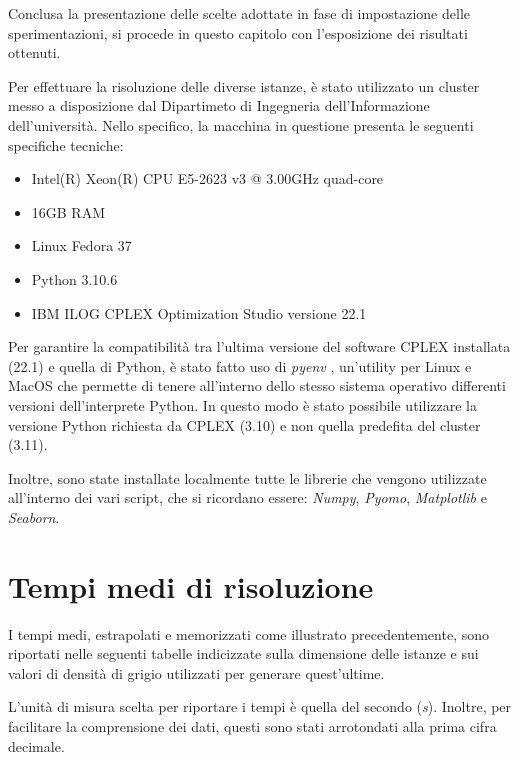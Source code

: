 Conclusa la presentazione delle scelte adottate in fase di impostazione delle sperimentazioni, 
si procede in questo capitolo con l'esposizione dei risultati ottenuti. 

Per effettuare la risoluzione delle diverse istanze, è stato utilizzato un cluster messo a disposizione dal Dipartimeto di Ingegneria dell'Informazione 
dell'università. Nello specifico, la macchina in questione presenta le seguenti specifiche tecniche:
\begin{itemize}
\item Intel(R) Xeon(R) CPU E5-2623 v3 @ 3.00GHz quad-core
\item 16GB RAM
\item Linux Fedora 37
\item Python 3.10.6
\item IBM ILOG CPLEX Optimization Studio versione 22.1
\end{itemize}
Per garantire la compatibilità tra l'ultima versione del software CPLEX installata (22.1) e quella di Python, è stato fatto uso di \textit{pyenv} \cite{pyenv}, 
un'utility per Linux e MacOS che permette di tenere all'interno dello stesso sistema operativo differenti versioni dell'interprete Python. In questo modo 
è stato possibile utilizzare la versione Python richiesta da CPLEX (3.10) e non quella predefita del cluster (3.11).

Inoltre, sono state installate localmente tutte le librerie che vengono utilizzate all'interno dei vari script, che si ricordano 
essere: \textit{Numpy}, \textit{Pyomo}, \textit{Matplotlib} e \textit{Seaborn}.

\newpage
\section{Tempi medi di risoluzione}
I tempi medi, estrapolati e memorizzati come illustrato precedentemente, sono riportati nelle seguenti tabelle indicizzate sulla dimensione delle istanze 
e sui valori di densità di grigio utilizzati per generare quest'ultime.

L'unità di misura scelta per riportare i tempi è quella del secondo (\textit{s}). Inoltre, per facilitare la comprensione dei dati, questi 
sono stati arrotondati alla prima cifra decimale.
\\

